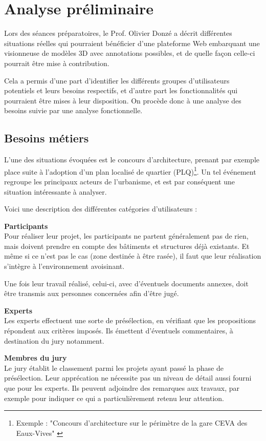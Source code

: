 \chapter{Analyse préliminaire}
\label{Chapter2}

Lors des séances préparatoires, le Prof. Olivier Donzé a décrit différentes situations réelles qui pourraient bénéficier d'une plateforme Web embarquant une visionneuse de modèles 3D avec annotations possibles, et de quelle façon celle-ci pourrait être mise à contribution.

Cela a permis d'une part d'identifier les différents groupes d'utilisateurs potentiels et leurs besoins respectifs, et d'autre part les fonctionnalités qui pourraient être mises à leur disposition. On procède donc à une analyse des besoins suivie par une analyse fonctionnelle.

\section{Besoins métiers}
\label{sec:requirements-analysis}

L'une des situations évoquées est le concours d'architecture, prenant par exemple place suite à l'adoption d'un plan localisé de quartier (PLQ)\footnote{Exemple : "Concours d'architecture sur le périmètre de la gare CEVA des Eaux-Vives" \cite{plq-contest}}.
Un tel événement regroupe les principaux acteurs de l'urbanisme, et est par conséquent une situation intéressante à analyser.

Voici une description des différentes catégories d'utilisateurs :

\textbf{Participants} \\
Pour réaliser leur projet, les participants ne partent généralement pas de rien, mais doivent prendre en compte des bâtiments et structures déjà existants. Et même si ce n'est pas le cas (zone destinée à être rasée), il faut que leur réalisation s'intègre à l'environnement avoisinant.

Une fois leur travail réalisé, celui-ci, avec d'éventuels documents annexes, doit être transmis aux personnes concernées afin d'être jugé.

\textbf{Experts} \\
Les experts effectuent une sorte de présélection, en vérifiant que les propositions répondent aux critères imposés. Ils émettent d'éventuels commentaires, à destination du jury notamment.

\textbf{Membres du jury} \\
Le jury établit le classement parmi les projets ayant passé la phase de présélection. Leur apprécation ne nécessite pas un niveau de détail aussi fourni que pour les experts. Ils peuvent adjoindre des remarques aux travaux, par exemple pour indiquer ce qui a particulièrement retenu leur attention.

